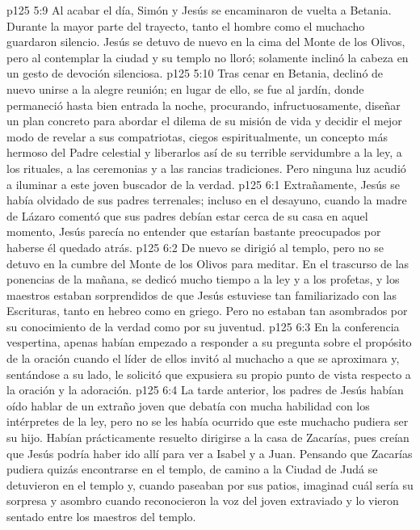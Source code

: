 \vs p125 5:9 \pc Al acabar el día, Simón y Jesús se encaminaron de vuelta a Betania. Durante la mayor parte del trayecto, tanto el hombre como el muchacho guardaron silencio. Jesús se detuvo de nuevo en la cima del Monte de los Olivos, pero al contemplar la ciudad y su templo no lloró; solamente inclinó la cabeza en un gesto de devoción silenciosa.
\vs p125 5:10 Tras cenar en Betania, declinó de nuevo unirse a la alegre reunión; en lugar de ello, se fue al jardín, donde permaneció hasta bien entrada la noche, procurando, infructuosamente, diseñar un plan concreto para abordar el dilema de su misión de vida y decidir el mejor modo de revelar a sus compatriotas, ciegos espiritualmente, un concepto más hermoso del Padre celestial y liberarlos así de su terrible servidumbre a la ley, a los rituales, a las ceremonias y a las rancias tradiciones. Pero ninguna luz acudió a iluminar a este joven buscador de la verdad.
\vs p125 6:1 Extrañamente, Jesús se había olvidado de sus padres terrenales; incluso en el desayuno, cuando la madre de Lázaro comentó que sus padres debían estar cerca de su casa en aquel momento, Jesús parecía no entender que estarían bastante preocupados por haberse él quedado atrás.
\vs p125 6:2 De nuevo se dirigió al templo, pero no se detuvo en la cumbre del Monte de los Olivos para meditar. En el trascurso de las ponencias de la mañana, se dedicó mucho tiempo a la ley y a los profetas, y los maestros estaban sorprendidos de que Jesús estuviese tan familiarizado con las Escrituras, tanto en hebreo como en griego. Pero no estaban tan asombrados por su conocimiento de la verdad como por su juventud.
\vs p125 6:3 En la conferencia vespertina, apenas habían empezado a responder a su pregunta sobre el propósito de la oración cuando el líder de ellos invitó al muchacho a que se aproximara y, sentándose a su lado, le solicitó que expusiera su propio punto de vista respecto a la oración y la adoración.
\vs p125 6:4 \pc La tarde anterior, los padres de Jesús habían oído hablar de un extraño joven que debatía con mucha habilidad con los intérpretes de la ley, pero no se les había ocurrido que este muchacho pudiera ser su hijo. Habían prácticamente resuelto dirigirse a la casa de Zacarías, pues creían que Jesús podría haber ido allí para ver a Isabel y a Juan. Pensando que Zacarías pudiera quizás encontrarse en el templo, de camino a la Ciudad de Judá se detuvieron en el templo y, cuando paseaban por sus patios, imaginad cuál sería su sorpresa y asombro cuando reconocieron la voz del joven extraviado y lo vieron sentado entre los maestros del templo.
